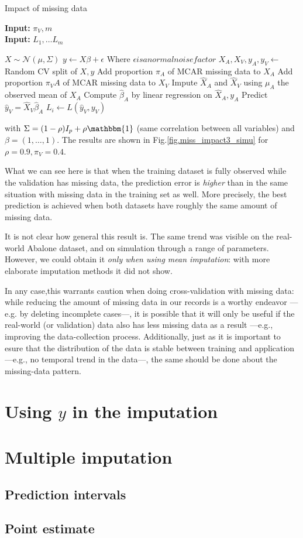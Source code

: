 \begin{algorithm}[H]
	\caption{Impact of missing data}
	\hspace*{\algorithmicindent} \textbf{Input:} $\pi_V, m$  \\
	\hspace*{\algorithmicindent} \textbf{Input:} $L_1, \ldots L_m$  \\
	\begin{algorithmic}[1]
		\State $X \sim \mathcal{N}(\mu,\Sigma)$
		\State $y \leftarrow X \beta + \epsilon$ \Comment Where $\epsilon is a normal noise factor$
		\State $X_A, X_V, y_A, y_V \leftarrow$ Random CV split of $X,y$
			\State Add proportion $\pi_A$ of MCAR missing data to $X_A$
			\State Add proportion $\pi_VA$ of MCAR missing data to $X_V$
			\State Impute $\hat{X}_A$ and $\hat{X}_V$ using $\mu_A$ the observed mean of $X_A$
			\State Compute $\hat{\beta}_A$ by linear regression on $\hat{X}_A, y_A$
			\State Predict $\hat{y}_V = \hat{X}_V \hat{\beta}_A$
			\State $L_i \leftarrow L(\hat{y}_V, y_V)$
		\EndFor
	\end{algorithmic}
\end{algorithm}

with $\Sigma = (1-\rho) I_p + \rho \mathbbm{1}$ (same correlation between all variables) and $\beta=(1,\ldots,1)$. The results are shown in Fig.\ref{fig.miss_impact3_simu} for $\rho=0.9, \pi_V=0.4$.



What we can see here is that when the training dataset is fully observed while the validation has missing data, the prediction error is \emph{higher} than in the same situation with missing data in the training set as well. More precisely, the best prediction is achieved when both datasets have roughly the same amount of missing data.

It is not clear how general this result is. The same trend was visible on the real-world Abalone dataset, and on simulation through a range of parameters. However, we could obtain it \emph{only when using mean imputation}: with more elaborate imputation methods it did not show.

 In any case,this warrants caution when doing cross-validation with missing data: while reducing the amount of missing data in our records is a worthy endeavor ---e.g. by deleting incomplete cases---, it is possible that it will only be useful if the real-world (or validation) data also has less missing data as a result ---e.g., improving the data-collection process. Additionally, just as it is important to esure that the distribution of the data is stable between training and application ---e.g., no temporal trend in the data---, the same should be done about the missing-data pattern.

	\section{Using $y$ in the imputation}
	\section{Multiple imputation}
		\subsection{Prediction intervals}
		\subsection{Point estimate}
